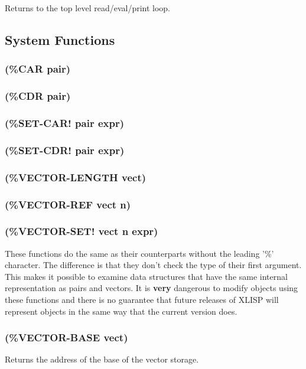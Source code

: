 \documentclass[11pt]{article}
\begin{document}
Returns to the top level read/eval/print loop.
\subsection{System Functions}
\label{sec-4-45}

\subsubsection{(\%CAR pair)}
\label{sec-4-45-1}
\subsubsection{(\%CDR pair)}
\label{sec-4-45-2}
\subsubsection{(\%SET-CAR! pair expr)}
\label{sec-4-45-3}
\subsubsection{(\%SET-CDR! pair expr)}
\label{sec-4-45-4}
\subsubsection{(\%VECTOR-LENGTH vect)}
\label{sec-4-45-5}
\subsubsection{(\%VECTOR-REF vect n)}
\label{sec-4-45-6}
\subsubsection{(\%VECTOR-SET! vect n expr)}
\label{sec-4-45-7}

These functions do the same as their counterparts without the leading
'\%' character.  The difference is that they don't check the type of
their first argument.  This makes it possible to examine data
structures that have the same internal representation as pairs and
vectors.  It is \textbf{very} dangerous to modify objects using these
functions and there is no guarantee that future releases of XLISP
will represent objects in the same way that the current version does.
\subsubsection{(\%VECTOR-BASE vect)}
\label{sec-4-45-8}

Returns the address of the base of the vector storage.
\end{document}
